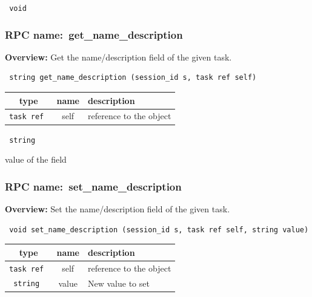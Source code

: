 \vspace{0.3cm}

{\tt 
void
}



\vspace{0.3cm}
\vspace{0.3cm}
\vspace{0.3cm}
\subsubsection{RPC name:~get\_name\_description}

{\bf Overview:} 
Get the name/description field of the given task.

\begin{verbatim} string get_name_description (session_id s, task ref self)\end{verbatim}



 
\vspace{0.3cm}
\begin{tabular}{|c|c|p{7cm}|}
 \hline
{\bf type} & {\bf name} & {\bf description} \\ \hline
{\tt task ref } & self & reference to the object \\ \hline 

\end{tabular}

\vspace{0.3cm}

{\tt 
string
}


value of the field
\vspace{0.3cm}
\vspace{0.3cm}
\vspace{0.3cm}
\subsubsection{RPC name:~set\_name\_description}

{\bf Overview:} 
Set the name/description field of the given task.

\begin{verbatim} void set_name_description (session_id s, task ref self, string value)\end{verbatim}



 
\vspace{0.3cm}
\begin{tabular}{|c|c|p{7cm}|}
 \hline
{\bf type} & {\bf name} & {\bf description} \\ \hline
{\tt task ref } & self & reference to the object \\ \hline 

{\tt string } & value & New value to set \\ \hline 

\end{tabular}

